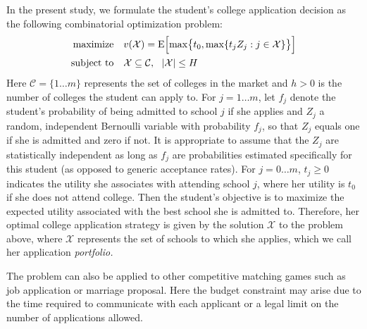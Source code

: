 In the present study, we formulate the student's college application decision as the following combinatorial optimization problem:
\begin{align} \label{headlineproblem}
\begin{split}
\text{maximize}\quad & v(\mathcal{X}) =  \operatorname{E}\Bigl[\max\bigr\{t_0,
\max\{t_j Z_j : j \in \mathcal{X}\}\bigr\}\Bigr] \\
\text{subject to}\quad & \mathcal{X} \subseteq \mathcal{C}, ~~|\mathcal{X}| \leq H
\end{split}
\end{align}
Here $\mathcal{C} = \{ 1 \dots m\}$ represents the set of colleges in the market and $h > 0$ is the number of colleges the student can apply to. For $j = 1 \dots m$, let $f_j$ denote the student's probability of being admitted to school $j$ if she applies and $Z_j$ a random, independent Bernoulli variable with probability $f_j$, so that $Z_j$ equals one if she is admitted and zero if not. It is appropriate to assume that the $Z_j$ are statistically independent as long as $f_j$ are probabilities estimated specifically for this student (as opposed to generic acceptance rates). For $j = 0\dots m$, $t_j\geq 0$ indicates the utility she associates with attending school $j$, where her utility is $t_0$ if she does not attend college. Then the student's objective is to maximize the expected utility associated with the best school she is admitted to. Therefore, her optimal college application strategy is given by the solution $\mathcal{X}$ to the problem above, where $\mathcal{X}$ represents the set of schools to which she applies, which we call her application \emph{portfolio.}

The problem can also be applied to other competitive matching games such as job application or marriage proposal. Here the budget constraint may arise due to the time required to communicate with each applicant or a legal limit on the number of applications allowed.

